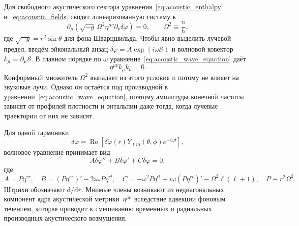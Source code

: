 \documentclass[12pt,a4paper,preprint,nopreprintline]{elsarticle}
\begin{document}
Для свободного акустического сектора уравнения~\eqref{eq:acoustic_enthalpy} и~\eqref{eq:acoustic_fields} сводят линеаризованную систему к
\begin{equation}
    \partial_{\mu}
    \left(
        \sqrt{-g}\,\Omega^{2}\eta^{\mu\nu}
        \partial_{\nu}\delta\varphi
    \right)=0,
    \qquad
    \Omega^{2}\equiv\frac{n}{h},
    \label{eq:acoustic_wave_equation}
\end{equation}
где $\sqrt{-g}=r^{2}\sin\theta$ для фона Шварцшильда. Чтобы явно выделить лучевой предел, введём эйкональный анзац $\delta\varphi=A\exp(i\omega\mathcal{S})$ и волновой ковектор $k_{\mu}=\partial_{\mu}\mathcal{S}$. В главном порядке по $\omega$ уравнение~\eqref{eq:acoustic_wave_equation} даёт
\begin{equation}
    \eta^{\mu\nu}k_{\mu}k_{\nu}=0.
    \label{eq:acoustic_eikonal_relation}
\end{equation}
Конформный множитель $\Omega^{2}$ выпадает из этого условия и потому не влияет на звуковые лучи. Однако он остаётся под производной в уравнении~\eqref{eq:acoustic_wave_equation}, поэтому амплитуды конечной частоты зависят от профилей плотности и энтальпии даже тогда, когда лучевые траектории от них не зависят.

Для одной гармоники
\begin{equation}
    \delta\varphi
    =
    \operatorname{Re}
    \left[
        \delta\widetilde{\varphi}(r)Y_{\ell m}(\theta,\phi)e^{-i\omega t}
    \right],
    \label{eq:acoustic_separation}
\end{equation}
волновое уравнение принимает вид
\begin{equation}
    A\delta\widetilde{\varphi}''
    +B\delta\widetilde{\varphi}'
    +C\delta\widetilde{\varphi}=0,
    \label{eq:radial_master_equation}
\end{equation}
где
\begin{equation}
    A=P\eta^{rr},
    \quad
    B=(P\eta^{rr})'-2i\omega P\eta^{rt},
    \quad
    C=-\omega^{2}P\eta^{tt}
       -i\omega(P\eta^{rt})'
       -\Omega^{2}\ell(\ell+1),
    \quad
    P\equiv r^{2}\Omega^{2}.
    \label{eq:radial_coefficients}
\end{equation}
Штрихи обозначают $\mathrm{d}/\mathrm{d}r$. Мнимые члены возникают из недиагональных компонент ядра акустической метрики~$\eta^{\mu\nu}$ вследствие адвекции фоновым течением, которая приводит к смешиванию временных и радиальных производных акустического возмущения.
\end{document}
